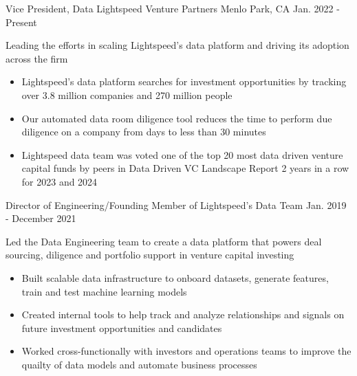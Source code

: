 

\begin{cventries}

  \cventry
  {Vice President, Data} %
  {Lightspeed Venture Partners} %
  {Menlo Park, CA} %
  {Jan. 2022 - Present} %
  {
    \begin{cvitems} %
      \item{Leading the efforts in scaling Lightspeed's data platform and driving its adoption across the firm}
      \begin{itemize}[label=$\circ$]
        \item{Lightspeed's data platform searches for investment opportunities by tracking over 3.8 million companies and 270 million people}
        \item{Our automated data room diligence tool reduces the time to perform due diligence on a company from days to less than 30 minutes}
        \item{Lightspeed data team was voted one of the top 20 most data driven venture capital funds by peers in Data Driven VC Landscape Report 2 years in a row for 2023 and 2024}
      \end{itemize}
    \end{cvitems}
  }

  \cventry
  {Director of Engineering/Founding Member of Lightspeed's Data Team} %
  {} %
  {} %
  {Jan. 2019 - December 2021} %
  {
    \begin{cvitems} %
      \item{Led the Data Engineering team to create a data platform that powers deal sourcing, diligence and portfolio support in venture capital investing}
      \begin{itemize}[label=$\circ$]
        \item{Built scalable data infrastructure to onboard datasets, generate features, train and test machine learning models}
        \item{Created internal tools to help track and analyze relationships and signals on future investment opportunities and candidates}
        \item{Worked cross-functionally with investors and operations teams to improve the quailty of data models and automate business processes}
      \end{itemize}
    \end{cvitems}
  }


\end{cventries}
